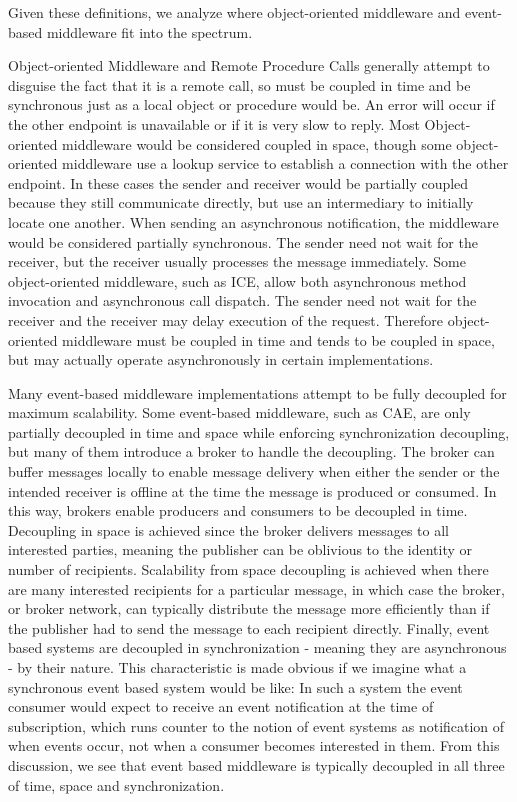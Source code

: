 \documentclass{acm_proc_article-sp}
\begin{document}
Given these definitions, we analyze where object-oriented middleware and event-based middleware fit into the spectrum.

Object-oriented Middleware and Remote Procedure Calls generally attempt to disguise the fact that it is a remote call, so must be coupled in time and be synchronous just as a local object or procedure would be. An error will occur if the other endpoint is unavailable or if it is very slow to reply. Most Object-oriented middleware would be considered coupled in space, though some object-oriented middleware use a lookup service to establish a connection with the other endpoint. In these cases the sender and receiver would be partially coupled because they still communicate directly, but use an intermediary to initially locate one another. When sending an asynchronous notification, the middleware would be considered partially synchronous. The sender need not wait for the receiver, but the receiver usually processes the message immediately.  Some object-oriented middleware, such as ICE, allow both asynchronous method invocation and asynchronous call dispatch.  The sender need not wait for the receiver and the receiver may delay execution of the request.  Therefore object-oriented middleware must be coupled in time and tends to be coupled in space, but may actually operate asynchronously in certain implementations.

Many event-based middleware implementations attempt to be fully decoupled for maximum scalability. Some event-based middleware, such as CAE, are only partially decoupled in time and space while enforcing synchronization decoupling, but many of them introduce a broker to handle the decoupling. The broker can buffer messages locally to enable message delivery when either the sender or the intended receiver is offline at the time the message is produced or consumed. In this way, brokers enable producers and consumers to be decoupled in time. Decoupling in space is achieved since the broker delivers messages to all interested parties, meaning the publisher can be oblivious to the identity or number of recipients. Scalability from space decoupling is achieved when there are many interested recipients for a particular message, in which case the broker, or broker network, can typically distribute the message more efficiently than if the publisher had to send the message to each recipient directly. Finally, event based systems are decoupled in synchronization - meaning they are asynchronous - by their nature. This characteristic is made obvious if we imagine what a synchronous event based system would be like: In such a system the event consumer would expect to receive an event notification at the time of subscription, which runs counter to the notion of event systems as notification of when events occur, not when a consumer becomes interested in them. From this discussion, we see that event based middleware is typically decoupled in all three of time, space and synchronization. 
\end{document}
